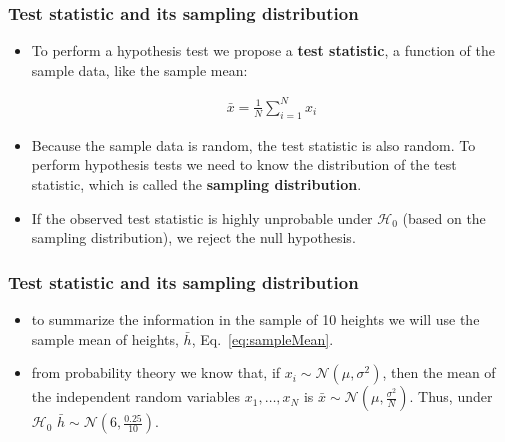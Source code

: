 \documentclass{beamer}
\begin{document}
\begin{frame}
\frametitle{Test statistic and its sampling distribution}

    \begin{itemize}

        \item To perform a hypothesis test we propose a \textbf{test statistic}, a
    function of the sample data, like the sample mean:

            \begin{align}
                \bar{x}=\frac{1}{N}\sum_{i=1}^Nx_i\label{eq:sampleMean}
            \end{align}

        \item Because the sample data is random, the test statistic is also
            random. To perform hypothesis tests we need to know the
            distribution of the test statistic, which is called the
            \textbf{sampling distribution}.

        \item If the observed test statistic is highly unprobable under
            $\mathcal{H}_0$ (based on the sampling distribution), we reject the
            null hypothesis.

    \end{itemize}

\end{frame}

\begin{frame}
\frametitle{Test statistic and its sampling distribution}

    \begin{example}
        \begin{itemize}

            \item to summarize the information in the sample of 10 heights we
                will use the sample mean of heights, $\bar{h}$,
                Eq.~\ref{eq:sampleMean}.

            \item from probability theory we know that, if
                $x_i\sim\mathcal{N}(\mu,\sigma^2)$, then the mean of the
                independent random variables $x_1,\ldots,x_N$ is
                $\bar{x}\sim\mathcal{N}(\mu, \frac{\sigma^2}{N})$. Thus, under
                $\mathcal{H}_0$ $\bar{h}\sim\mathcal{N}(6, \frac{0.25}{10})$.

        \end{itemize}
    \end{example}

\end{frame}
\end{document}
